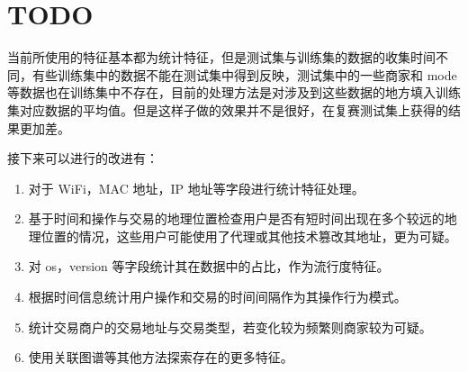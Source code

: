 \documentclass[12pt]{article}
\begin{document}
\section{TODO}
当前所使用的特征基本都为统计特征，但是测试集与训练集的数据的收集时间不同，有些训练集中的数据不能在测试集中得到反映，测试集中的一些商家和 mode 等数据也在训练集中不存在，目前的处理方法是对涉及到这些数据的地方填入训练集对应数据的平均值。但是这样子做的效果并不是很好，在复赛测试集上获得的结果更加差。

接下来可以进行的改进有：
\begin{enumerate}
    \item 对于 WiFi，MAC 地址，IP 地址等字段进行统计特征处理。
    \item 基于时间和操作与交易的地理位置检查用户是否有短时间出现在多个较远的地理位置的情况，这些用户可能使用了代理或其他技术篡改其地址，更为可疑。
    \item 对 os，version 等字段统计其在数据中的占比，作为流行度特征。
    \item 根据时间信息统计用户操作和交易的时间间隔作为其操作行为模式。
    \item 统计交易商户的交易地址与交易类型，若变化较为频繁则商家较为可疑。
    \item 使用关联图谱等其他方法探索存在的更多特征。
\end{enumerate}
\end{document}

